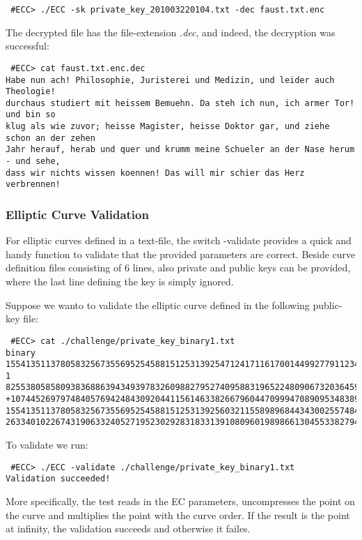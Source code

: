 \documentclass[11pt,english]{article}
\begin{document}
\begin{verbatim}
 #ECC> ./ECC -sk private_key_201003220104.txt -dec faust.txt.enc
\end{verbatim}

The decrypted file has the file-extension \emph{.dec}, and indeed, the decryption was successful:

\begin{verbatim}
 #ECC> cat faust.txt.enc.dec
Habe nun ach! Philosophie, Juristerei und Medizin, und leider auch Theologie!
durchaus studiert mit heissem Bemuehn. Da steh ich nun, ich armer Tor! und bin so
klug als wie zuvor; heisse Magister, heisse Doktor gar, und ziehe schon an der zehen
Jahr herauf, herab und quer und krumm meine Schueler an der Nase herum - und sehe,
dass wir nichts wissen koennen! Das will mir schier das Herz verbrennen!
\end{verbatim}

\subsubsection{Elliptic Curve Validation}
For elliptic curves defined in a text-file, the switch -validate provides a quick and handy function to validate that the provided parameters are correct. Beside curve definition files consisting of 6 lines, also private and public keys can be provided, where the last line defining the key is simply ignored.

Suppose we wanto to validate the elliptic curve defined in the following public-key file:

\begin{verbatim}
 #ECC> cat ./challenge/private_key_binary1.txt
binary
15541351137805832567355695254588151253139254712417116170014499277911234281641667989665
1
8255380585809383688639434939783260988279527409588319652248090673203645932948626009724
+10744526979748405769424843092044115614633826679604470999470890953483892379364112110203
15541351137805832567355695254588151253139256032115589896844343002557484362928298853438
26334010226743190633240527195230292831833139108096019898661304553382794977231705
\end{verbatim}

To validate we run:

\begin{verbatim}
 #ECC> ./ECC -validate ./challenge/private_key_binary1.txt
Validation succeeded!
\end{verbatim}

More specifically, the test reads in the EC parameters, uncompresses the point on the curve and multiplies the point with the curve order. If the result is the point at infinity, the validation succeeds and otherwise it failes.
\end{document}

